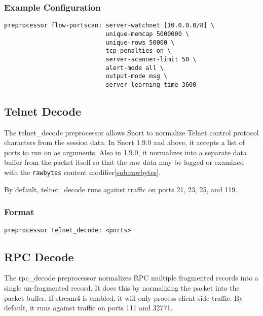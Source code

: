 \documentclass[english]{report}
\begin{document}
\subsubsection{Example Configuration}

\begin{verbatim}
preprocessor flow-portscan: server-watchnet [10.0.0.0/8] \
                            unique-memcap 5000000 \
                            unique-rows 50000 \
                            tcp-penalties on \
                            server-scanner-limit 50 \
                            alert-mode all \
                            output-mode msg \
                            server-learning-time 3600
\end{verbatim}



\subsection{Telnet Decode\label{sub:telnet-decode}}

The telnet\_decode preprocessor allows Snort to normalize Telnet control
protocol characters from the session data. In Snort 1.9.0 and above,
it accepts a list of ports to run on as arguments. Also in 1.9.0,
it normalizes into a separate data buffer from the packet itself so
that the raw data may be logged or examined with the \texttt{rawbytes} content
modifier\ref{sub:rawbytes}.

By default, telnet\_decode runs against traffic on ports 21, 23, 25, and 119.

\subsubsection{Format}

\begin{verbatim}
preprocessor telnet_decode: <ports> 
\end{verbatim}

\subsection{RPC Decode\label{sub:rpc-decoder}}

The rpc\_decode preprocessor normalizes RPC multiple fragmented
records into a single un-fragmented record.  It does this by
normalizing the packet into the packet buffer.  If stream4 is
enabled, it will only process client-side traffic.  By default, it runs against
traffic on ports 111 and 32771.
\end{document}
